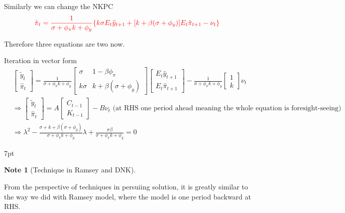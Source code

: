 \documentclass{article}
\newenvironment{blueblock}{
\def\FrameCommand{
  \hspace{1pt}
    {\color{DarkBlue}
    \vrule width 2pt}
    {\color{blueshade}
    \vrule width 4pt}
  \colorbox{blueshade}
}
\MakeFramed{
  \advance
  \hsize-
  \width
  \FrameRestore}
\noindent\hspace{-4.55pt}%
\begin{adjustwidth}{}{7pt}
\vspace{2pt}\vspace{2pt}
}
{\vspace{2pt}\end{adjustwidth}\endMakeFramed}
\newtheorem{note}{Note}
\begin{document}
Similarly we can change the NKPC
\begin{align}
& \color{red} \hat \pi_t =\frac{1}{\sigma+\phi_\pi k + \phi_y} 
\{k\sigma E_t \tilde y_{t+1}+[k+\beta(\sigma+\phi_y)]E_t \hat \pi_{t+1}-\nu_t\}
\end{align}

Therefore three equations are two now.

Iteration in vector form
\begin{align}
&
\begin{bmatrix}
\tilde y_t \\
\hat \pi_t
\end{bmatrix}
=\frac{1}{\sigma+\phi_\pi k + \phi_y} 
\begin{bmatrix}
\sigma & 1-\beta \phi_\pi
\\
k \sigma & k+\beta(\sigma+\phi_y)
\end{bmatrix}
\begin{bmatrix}
E_t \hat y_{t+1}
\\
E_t \hat \pi_{t+1}
\end{bmatrix}
-\frac{1}{\sigma+\phi_\pi k + \phi_y} 
\begin{bmatrix}
  1
  \\
  k
\end{bmatrix} \nu_t
\\& \Rightarrow
\begin{bmatrix}
\tilde y_t \\
\hat \pi_t
\end{bmatrix}
=A
\begin{bmatrix}
  C_{t-1}
  \\
  K_{t-1}
\end{bmatrix}
-B \nu_t
 \text{ (at RHS one period ahead meaning the whole equation is foresight-seeing)}
\\& \Rightarrow \lambda^2-\frac{\sigma+k+\beta(\sigma+\phi_y)}{\sigma+\phi_\pi k +\phi_y} \lambda+\frac{\sigma \beta}{\sigma+\phi_\pi k +\phi_y}=0
\end{align}

\begin{blueblock}
\begin{note}[Technique in Ramsey and DNK]
\end{note}
From the perspective of techniques in persuiing solution, it is greatly similar to the way we did with Ramsey model, where the model is one period backward at RHS.
\end{blueblock}
\end{document}

